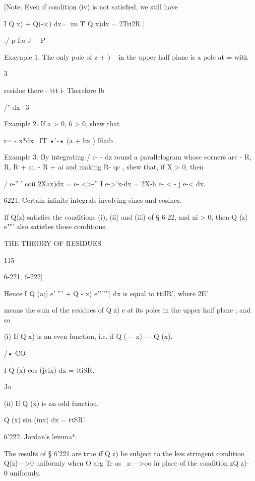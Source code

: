 [Note. Even if condition (iv) is not satisfied, we still have 

I  Q x) + Q(-a;) dx=\ im T Q x)dx = 2Tri2R.] 

./ p f:o J —P 

Exaynple 1. The only pole of  z + ) ~  in the upper half plane is a pole at   =    with 



3 

residue there -  ttt i- Therefore 
lb 



/"  dx \  3 

Example 2. If a > 0, 6 > 0, shew that 

r= - x*dx \  IT 
•'-• (a + bx )  I6aib  

Example 3. By integrating / e- - dz round a parallelogram whose corners are 
- R, R, R + ai, - R + ai and making R- qc , shew that, if X > 0, then 

/ e-'' ' coii 2Xax)dx = e- <>-'' I e->'x-dx = 2X-h e- < - j e-< dx. 

6221. Certain infinite integrals involving sines and cosines. 

If Q(z) satisfies the conditions (i), (ii) and (iii) of § 6-22, and ni > 0, then 
Q (z) e""'  also satisfies those conditions. 



THE THEORY OF RESIDUES 



115 



6-221, 6-222] 

Hence I  Q (a;) e' ''' + Q  - x) e'"''''] dx is equal to  ttiIR', where 2E' 

means the sum of the residues of Q  z) e   at its poles in the upper half plane ; 
and so 

(i) If Q  x) is an even function, i.e. if Q (— x) — Q (x), 

/• CO 

I Q (x) cos (jyix) dx = ttiSR. 

Jo 

(ii) If Q (x) is an odd function, 

Q (x) sin (inx) dx = ttSR'. 



6'222. Jordan's lemma*. 

The results of § 6'221 are true if Q  z) be subject to the less stringent 
condition Q(z)—>0 uniformly when O arg Tr as \ z:—>oo in place of the 
condition zQ z)- 0 uniformly. 

